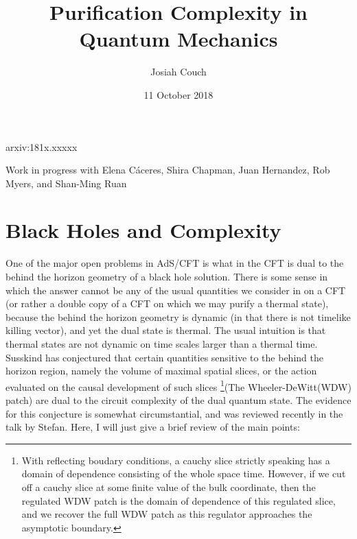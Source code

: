 \documentclass[12pt]{amsart}
\author{Josiah Couch}
\date{11 October 2018}
\begin{document}
\title{Purification Complexity in Quantum Mechanics}

\maketitle

\centerline{arxiv:181x.xxxxx}

\centerline{Work in progress with Elena C\'aceres, Shira Chapman, Juan Hernandez, Rob Myers, and Shan-Ming Ruan}

\tableofcontents

\section{Black Holes and Complexity}

One of the major open problems in AdS/CFT is what in the CFT is dual to the behind the horizon geometry of a black hole solution. There is some sense in which the answer cannot be any of the usual quantities we consider in on a CFT (or rather a double copy of a CFT on which we may purify a thermal state), because the behind the horizon geometry is dynamic (in that there is not timelike killing vector), and yet the dual state is thermal. The usual intuition is that thermal states are not dynamic on time scales larger than a thermal time. Susskind has conjectured that certain quantities sensitive to the behind the horizon  region, namely the volume of maximal spatial slices, or the action evaluated on the causal development of such slices \footnote{With reflecting boudary conditions, a cauchy slice strictly speaking has a domain of dependence consisting of the whole space time. However, if we cut off a cauchy slice at some finite value of the bulk coordinate, then the regulated WDW patch is the domain of dependence of this regulated slice, and we recover the full WDW patch as this regulator approaches the asymptotic boundary.}(The Wheeler-DeWitt(WDW) patch) are dual to the circuit complexity of the dual quantum state. The evidence for this conjecture is somewhat circumstantial, and was reviewed recently in the talk by Stefan. Here, I will just give a brief review of the main points: 
\end{document}
